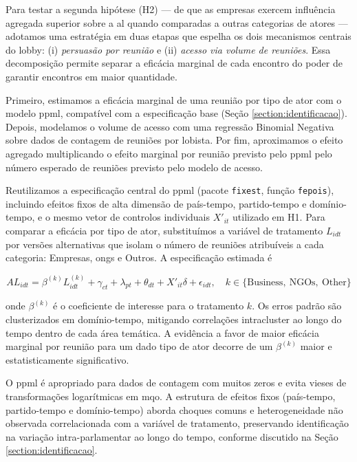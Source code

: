 
Para testar a segunda hipótese (H2) — de que as empresas exercem influência agregada superior sobre a \acrshort{al} quando comparadas a outras categorias de atores — adotamos uma estratégia em duas etapas que espelha os dois mecanismos centrais do lobby: (i) \textit{persuasão por reunião} e (ii) \textit{acesso via volume de reuniões}. Essa decomposição permite separar a eficácia marginal de cada encontro do poder de garantir encontros em maior quantidade.

Primeiro, estimamos a eficácia marginal de uma reunião por tipo de ator com o modelo \acrshort{ppml}, compatível com a especificação base (Seção \ref{section:identificacao}). Depois, modelamos o volume de acesso com uma regressão Binomial Negativa sobre dados de contagem de reuniões por lobista. Por fim, aproximamos o efeito agregado multiplicando o efeito marginal por reunião previsto pelo \acrshort{ppml} pelo número esperado de reuniões previsto pelo modelo de acesso.

Reutilizamos a especificação central do \acrshort{ppml} (pacote \texttt{fixest}, função \texttt{fepois}), incluindo efeitos fixos de alta dimensão de país-tempo, partido-tempo e domínio-tempo, e o mesmo vetor de controlos individuais $X'_{it}$ utilizado em H1. Para comparar a eficácia por tipo de ator, substituímos a variável de tratamento $L_{idt}$ por versões alternativas que isolam o número de reuniões atribuíveis a cada categoria: Empresas, \acrshort{ong}s e Outros. A especificação estimada é

\begin{equation}
    AL_{idt} = \beta^{(k)} L_{idt}^{(k)} + \gamma_{ct} + \lambda_{pt} + \theta_{dt} + X'_{it}\delta + \epsilon_{idt}, \quad k \in \{\text{Business},\ \text{NGOs},\ \text{Other}\}
\end{equation}

onde $\beta^{(k)}$ é o coeficiente de interesse para o tratamento $k$. Os erros padrão são clusterizados em domínio-tempo, mitigando correlações intracluster ao longo do tempo dentro de cada área temática. A evidência a favor de maior eficácia marginal por reunião para um dado tipo de ator decorre de um $\beta^{(k)}$ maior e estatisticamente significativo.

O \acrshort{ppml} é apropriado para dados de contagem com muitos zeros e evita vieses de transformações logarítmicas em \acrshort{mqo}. A estrutura de efeitos fixos (país-tempo, partido-tempo e domínio-tempo) aborda choques comuns e heterogeneidade não observada correlacionada com a variável de tratamento, preservando identificação na variação intra-parlamentar ao longo do tempo, conforme discutido na Seção \ref{section:identificacao}.

